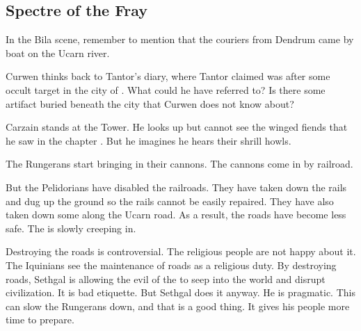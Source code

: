 \subsection{Spectre of the Fray}
\begin{changes}
  \begin{comment}
    \paragraph{The Ghost Tower}
  \end{comment}
    In the Bila scene, remember to mention that the couriers from Dendrum came by boat on the Ucarn river. 
  
    Curwen thinks back to Tantor's diary, where Tantor claimed \Takestsha was after some occult target in the city of \Forclin.
    What could he have referred to? 
    Is there some artifact buried beneath the city that Curwen does not know about?
    
    Carzain stands at the Tower.
    He looks up but cannot see the winged fiends that he saw in the chapter \quo{\Forclin}. 
    But he imagines he hears their shrill howls. 
    
  \begin{comment}
    \paragraph{A Machine of Flesh and Iron}
  \end{comment}
    The Rungerans start bringing in their cannons. 
    The cannons come in by railroad. 

    But the Pelidorians have disabled the railroads. 
    They have taken down the rails and dug up the ground so the rails cannot be easily repaired. 
    They have also taken down some \eidola along the Ucarn road. 
    As a result, the roads have become less safe.
    The \wylde is slowly creeping in. 

    Destroying the roads is controversial.
    The religious people are not happy about it. 
    The Iquinians see the maintenance of roads as a religious duty.
    By destroying roads, Sethgal is allowing the evil of the \wylde to seep into the world and disrupt civilization.
    It is bad etiquette.
    But Sethgal does it anyway.
    He is pragmatic. 
    This can slow the Rungerans down, and that is a good thing. 
    It gives his people more time to prepare. 


\end{changes}
